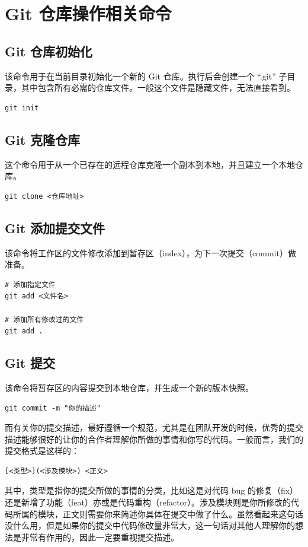 \documentclass[UTF8]{gyh}
\begin{document}
    \section{Git 仓库操作相关命令}

    \subsection{Git 仓库初始化}
    该命令用于在当前目录初始化一个新的 Git 仓库。执行后会创建一个 “.git” 子目录，其中包含所有必需的仓库文件。一般这个文件是隐藏文件，无法直接看到。
    \begin{lstlisting}
git init
    \end{lstlisting}

    \subsection{Git 克隆仓库}
    这个命令用于从一个已存在的远程仓库克隆一个副本到本地，并且建立一个本地仓库。
    \begin{lstlisting}
git clone <仓库地址>
    \end{lstlisting}

    \subsection{Git 添加提交文件}
    该命令将工作区的文件修改添加到暂存区（index），为下一次提交（commit）做准备。
    \begin{lstlisting}
# 添加指定文件
git add <文件名>

# 添加所有修改过的文件
git add .
    \end{lstlisting}

    \subsection{Git 提交}
    该命令将暂存区的内容提交到本地仓库，并生成一个新的版本快照。
    \begin{lstlisting}
git commit -m "你的描述"
    \end{lstlisting}
    而有关你的提交描述，最好遵循一个规范，尤其是在团队开发的时候，优秀的提交描述能够很好的让你的合作者理解你所做的事情和你写的代码。一般而言，我们的提交格式是这样的：
    \begin{lstlisting}
[<类型>](<涉及模块>) <正文>
    \end{lstlisting}
    其中，类型是指你的提交所做的事情的分类，比如这是对代码 bug 的修复（fix）还是新增了功能（feat）亦或是代码重构（refactor）。涉及模块则是你所修改的代码所属的模块，正文则需要你来简述你具体在提交中做了什么。虽然看起来这句话没什么用，但是如果你的提交中代码修改量非常大，这一句话对其他人理解你的想法是非常有作用的，因此一定要重视提交描述。
\end{document}
